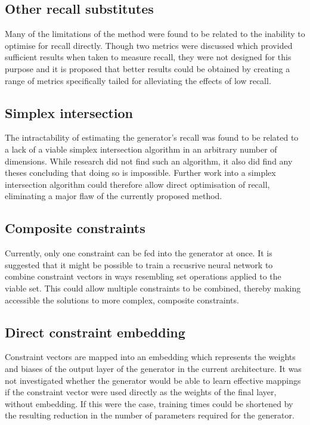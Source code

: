\documentclass[../../main.tex]{subfiles}
\begin{document}
\subsection{Other recall substitutes}

Many of the limitations of the method were found to be related to the inability to optimise for recall directly.
Though two metrics were discussed which provided sufficient results when taken to measure recall, they were not designed for this purpose and it is proposed that better results could be obtained by creating a range of metrics specifically tailed for alleviating the effects of low recall.

\subsection{Simplex intersection}

The intractability of estimating the generator's recall was found to be related to a lack of a viable simplex intersection algorithm in an arbitrary number of dimensions.
While research did not find such an algorithm, it also did find any theses concluding that doing so is impossible.
Further work into a simplex intersection algorithm could therefore allow direct optimisation of recall, eliminating a major flaw of the currently proposed method.

\subsection{Composite constraints}

Currently, only one constraint can be fed into the generator at once.
It is suggested that it might be possible to train a recusrive neural network to combine constraint vectors in ways resembling set operations applied to the viable set.
This could allow multiple constraints to be combined, thereby making accessible the solutions to more complex, composite constraints.

\subsection{Direct constraint embedding}

Constraint vectors are mapped into an embedding which represents the weights and biases of the output layer of the generator in the current architecture.
It was not investigated whether the generator would be able to learn effective mappings if the constraint vector were used directly as the weights of the final layer, without embedding.
If this were the case, training times could be shortened by the resulting reduction in the number of parameters required for the generator.
\end{document}
